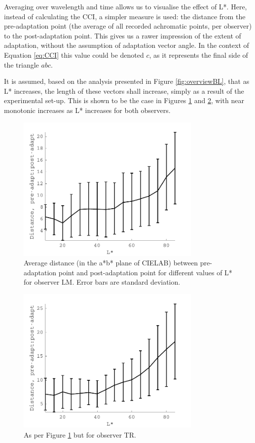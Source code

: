 Averaging over wavelength and time allows us to visualise the effect of L*. Here, instead of calculating the \gls{CCI}, a simpler measure is used: the distance from the pre-adaptation point (the average of all recorded achromatic points, per observer) to the post-adaptation point. This gives us a rawer impression of the extent of adaptation, without the assumption of adaptation vector angle. In the context of Equation \ref{eq:CCI} this value could be denoted $c$, as it represents the final side of the triangle $abc$. 

It is assumed, based on the analysis presented in Figure \ref{fig:overviewBL}, that as L* increases, the length of these vectors shall increase, simply as a result of the experimental set-up. This is shown to be the case in Figures \ref{fig:LMCCI_L} and \ref{fig:TRCCI_L}, with near monotonic increases as L* increases for both observers.

\begin{figure}[htbp]
\includegraphics[max width=0.8\textwidth]{figs/LargeSphere/LMCCI_L.pdf}
\caption{Average distance (in the a*b* plane of CIELAB) between pre-adaptation point and post-adaptation point for different values of L* for observer LM. Error bars are standard deviation.}
\label{fig:LMCCI_L}
\end{figure}

\begin{figure}[htbp]
\includegraphics[max width=0.8\textwidth]{figs/LargeSphere/TRCCI_L.pdf}
\caption{As per Figure \ref{fig:LMCCI_L} but for observer TR.}
\label{fig:TRCCI_L}
\end{figure}

